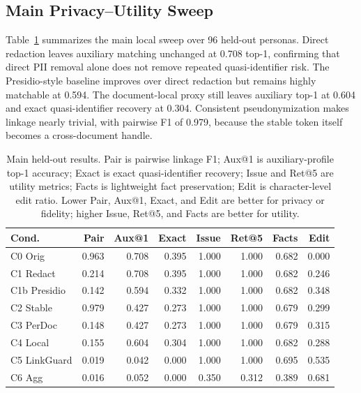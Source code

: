 \documentclass{article}
\newcommand{\method}{LinkGuard}
\begin{document}
\subsection{Main Privacy--Utility Sweep}

Table~\ref{tab:main} summarizes the main local sweep over 96 held-out personas.
Direct redaction leaves auxiliary matching unchanged at 0.708 top-1, confirming that direct PII removal alone does not remove repeated quasi-identifier risk.
The Presidio-style baseline improves over direct redaction but remains highly matchable at 0.594.
The document-local proxy still leaves auxiliary top-1 at 0.604 and exact quasi-identifier recovery at 0.304.
Consistent pseudonymization makes linkage nearly trivial, with pairwise F1 of 0.979, because the stable token itself becomes a cross-document handle.

\begin{table}[t]
\centering
\scriptsize
\setlength{\tabcolsep}{3.2pt}
\begin{tabular}{lrrrrrrr}
\toprule
Cond. & Pair & Aux@1 & Exact & Issue & Ret@5 & Facts & Edit \\
\midrule
C0 Orig & 0.963 & 0.708 & 0.395 & 1.000 & 1.000 & 0.682 & 0.000 \\
C1 Redact & 0.214 & 0.708 & 0.395 & 1.000 & 1.000 & 0.682 & 0.246 \\
C1b Presidio & 0.142 & 0.594 & 0.332 & 1.000 & 1.000 & 0.682 & 0.348 \\
C2 Stable & 0.979 & 0.427 & 0.273 & 1.000 & 1.000 & 0.679 & 0.299 \\
C3 PerDoc & 0.148 & 0.427 & 0.273 & 1.000 & 1.000 & 0.679 & 0.315 \\
C4 Local & 0.155 & 0.604 & 0.304 & 1.000 & 1.000 & 0.682 & 0.288 \\
C5 \method{} & 0.019 & 0.042 & 0.000 & 1.000 & 1.000 & 0.695 & 0.535 \\
C6 Agg & 0.016 & 0.052 & 0.000 & 0.350 & 0.312 & 0.389 & 0.681 \\
\bottomrule
\end{tabular}
\caption{Main held-out results. Pair is pairwise linkage F1; Aux@1 is auxiliary-profile top-1 accuracy; Exact is exact quasi-identifier recovery; Issue and Ret@5 are utility metrics; Facts is lightweight fact preservation; Edit is character-level edit ratio. Lower Pair, Aux@1, Exact, and Edit are better for privacy or fidelity; higher Issue, Ret@5, and Facts are better for utility.}
\label{tab:main}
\end{table}
\end{document}
